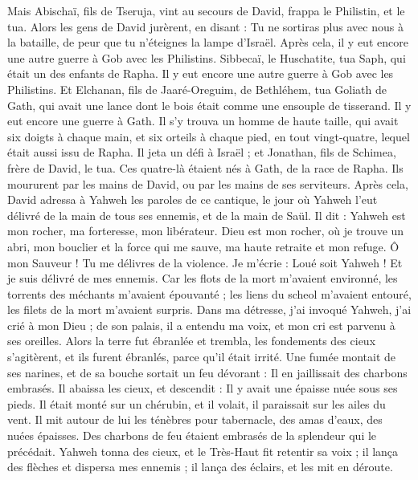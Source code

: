 \begin{multicols}{2}
Mais Abischaï, fils de Tseruja, vint au secours de David, frappa le Philistin, et le tua. Alors les gens de David jurèrent, en disant : Tu ne sortiras plus avec nous à la bataille, de peur que tu n'éteignes la lampe d'Israël.
Après cela, il y eut encore une autre guerre à Gob avec les Philistins. Sibbecaï, le Huschatite, tua Saph, qui était un des enfants de Rapha.
Il y eut encore une autre guerre à Gob avec les Philistins. Et Elchanan, fils de Jaaré-Oreguim, de Bethléhem, tua Goliath de Gath, qui avait une lance dont le bois était comme une ensouple de tisserand.
Il y eut encore une guerre à Gath. Il s'y trouva un homme de haute taille, qui avait six doigts à chaque main, et six orteils à chaque pied, en tout vingt-quatre, lequel était aussi issu de Rapha.
Il jeta un défi à Israël ; et Jonathan, fils de Schimea, frère de David, le tua.
Ces quatre-là étaient nés à Gath, de la race de Rapha. Ils moururent par les mains de David, ou par les mains de ses serviteurs.
\VerseOne{}Après cela, David adressa à Yahweh les paroles de ce cantique, le jour où Yahweh l'eut délivré de la main de tous ses ennemis, et de la main de Saül.
Il dit : Yahweh est mon rocher, ma forteresse, mon libérateur.
Dieu est mon rocher, où je trouve un abri, mon bouclier et la force qui me sauve, ma haute retraite et mon refuge. Ô mon Sauveur ! Tu me délivres de la violence.
Je m'écrie : Loué soit Yahweh ! Et je suis délivré de mes ennemis.
Car les flots de la mort m'avaient environné, les torrents des méchants m'avaient épouvanté ;
les liens du scheol m'avaient entouré, les filets de la mort m'avaient surpris.
Dans ma détresse, j'ai invoqué Yahweh, j'ai crié à mon Dieu ; de son palais, il a entendu ma voix, et mon cri est parvenu à ses oreilles.
Alors la terre fut ébranlée et trembla, les fondements des cieux s'agitèrent, et ils furent ébranlés, parce qu'il était irrité.
Une fumée montait de ses narines, et de sa bouche sortait un feu dévorant : Il en jaillissait des charbons embrasés.
Il abaissa les cieux, et descendit : Il y avait une épaisse nuée sous ses pieds.
Il était monté sur un chérubin, et il volait, il paraissait sur les ailes du vent.
Il mit autour de lui les ténèbres pour tabernacle, des amas d'eaux, des nuées épaisses.
Des charbons de feu étaient embrasés de la splendeur qui le précédait.
Yahweh tonna des cieux, et le Très-Haut fit retentir sa voix ;
il lança des flèches et dispersa mes ennemis ; il lança des éclairs, et les mit en déroute.

\end{multicols}
